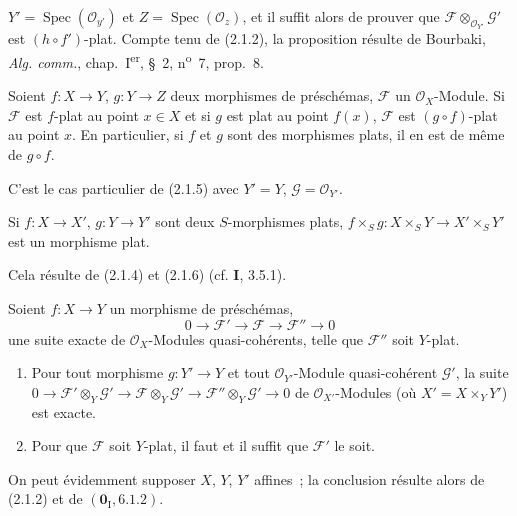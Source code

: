 $Y'=\operatorname{Spec}(\mathcal O_{y'})$ et
$Z=\operatorname{Spec}(\mathcal O_z)$, et il suffit alors de prouver que
$\mathscr F\otimes_{\mathcal O_{Y'}}\mathscr G'$ est $(h\circ f')$-plat. Compte tenu de
(2.1.2), la proposition résulte de Bourbaki, \emph{Alg. comm.},
chap.~I\textsuperscript{er}, \S~2, n\textsuperscript{o}~7, prop.~8.

\begin{corollary}[2.1.6]
\label{IV.2.1.6-fr}
Soient $f:X\to Y$, $g:Y\to Z$ deux morphismes de préschémas, $\mathscr F$ un
$\mathcal O_X$-Module. Si $\mathscr F$ est $f$-plat au point $x\in X$ et si
$g$ est plat au point $f(x)$, $\mathscr F$ est $(g\circ f)$-plat au point $x$. En
particulier, si $f$ et $g$ sont des morphismes plats, il en est de même de
$g\circ f$.
\end{corollary}

C'est le cas particulier de (2.1.5) avec $Y'=Y$, $\mathscr G=\mathcal O_{Y'}$.

\begin{corollary}[2.1.7]
\label{IV.2.1.7-fr}
Si $f:X\to X'$, $g:Y\to Y'$ sont deux $S$-morphismes plats,
$f\times_S g:X\times_S Y\to X'\times_S Y'$ est un morphisme plat.
\end{corollary}

Cela résulte de (2.1.4) et (2.1.6) (cf. \textbf{I}, 3.5.1).

\begin{proposition}[2.1.8]
\label{IV.2.1.8-fr}
Soient $f:X\to Y$ un morphisme de préschémas,
\[
0\to\mathscr F'\to\mathscr F\to\mathscr F''\to0
\]
une suite exacte de $\mathcal O_X$-Modules quasi-cohérents, telle que
$\mathscr F''$ soit $Y$-plat.
\begin{enumerate}
\item[\textup{(i)}] Pour tout morphisme $g:Y'\to Y$ et tout $\mathcal O_{Y'}$-Module
quasi-cohérent $\mathscr G'$, la suite
$0\to\mathscr F'\otimes_Y\mathscr G'\to
\mathscr F\otimes_Y\mathscr G'\to
\mathscr F''\otimes_Y\mathscr G'\to0$
de $\mathcal O_{X'}$-Modules (où $X'=X\times_Y Y'$) est exacte.
\item[\textup{(ii)}] Pour que $\mathscr F$ soit $Y$-plat, il faut et il suffit que
$\mathscr F'$ le soit.
\end{enumerate}
\end{proposition}

On peut évidemment supposer $X$, $Y$, $Y'$ affines~; la conclusion résulte
alors de (2.1.2) et de $(\mathbf{0}_{\mathrm I},6.1.2)$.

